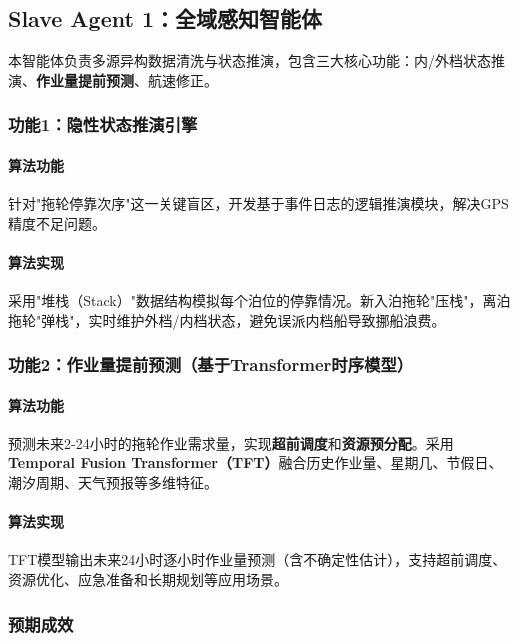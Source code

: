 \documentclass[12pt,a4paper]{article}
\begin{document}
\subsection{Slave Agent 1：全域感知智能体}

本智能体负责多源异构数据清洗与状态推演，包含三大核心功能：内/外档状态推演、\textbf{作业量提前预测}、航速修正。

\subsubsection{功能1：隐性状态推演引擎}

\paragraph{算法功能}

针对"拖轮停靠次序"这一关键盲区，开发基于事件日志的逻辑推演模块，解决GPS精度不足问题。

\paragraph{算法实现}

采用"堆栈（Stack）"数据结构模拟每个泊位的停靠情况。新入泊拖轮"压栈"，离泊拖轮"弹栈"，实时维护外档/内档状态，避免误派内档船导致挪船浪费。

\subsubsection{功能2：作业量提前预测（基于Transformer时序模型）}

\paragraph{算法功能}

预测未来2-24小时的拖轮作业需求量，实现\textbf{超前调度}和\textbf{资源预分配}。采用\textbf{Temporal Fusion Transformer（TFT）}融合历史作业量、星期几、节假日、潮汐周期、天气预报等多维特征。

\paragraph{算法实现}

TFT模型输出未来24小时逐小时作业量预测（含不确定性估计），支持超前调度、资源优化、应急准备和长期规划等应用场景。

\subsubsection{预期成效}
\end{document}
